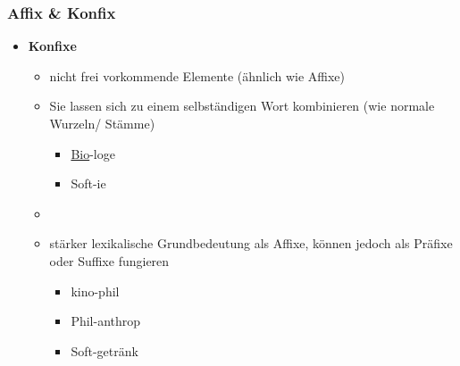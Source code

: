 \begin{frame}
\frametitle{Affix \& Konfix}

\begin{itemize}
	\item \textbf{Konfixe}
	
	\begin{itemize}
		\item nicht frei vorkommende Elemente (ähnlich wie Affixe)
		\item Sie lassen sich zu einem selbständigen Wort kombinieren (wie normale Wurzeln/ Stämme)
		
		\begin{itemize}
			\item \underline{Bio}-loge
			\item Soft-ie
		\end{itemize}
		
		\item[]
		\item stärker lexikalische Grundbedeutung als Affixe, können jedoch als Präfixe oder Suffixe fungieren
		
		\begin{itemize}
			\item kino-phil
			\item Phil-anthrop
			\item Soft-getränk
		\end{itemize}
	\end{itemize}
\end{itemize}


\end{frame}


